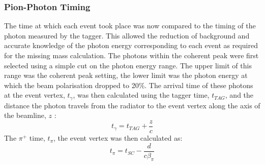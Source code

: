 \subsubsection{Pion-Photon Timing}
The time at which each event took place was now compared to the timing of the photon measured by the tagger. This allowed the reduction of background and accurate knowledge of the photon energy corresponding to each event as required for the missing mass calculation. The photons within the coherent peak were first selected using a simple cut on the photon energy range. The upper limit of this range was the coherent peak setting, the lower limit was the photon energy at which the beam polarisation dropped to 20\%. The arrival time of these photons at the event vertex, $ t_\gamma$, was then calculated using the tagger time, $t_{TAG}$, and the distance the photon travels from the radiator to the event vertex along the axis of the beamline, $z$ :
$$
t_\gamma = t_{TAG} + \frac{z}{c}
$$
The $\pi^+$ time, $t_\pi$, the event vertex was then calculated as:
$$
t_\pi = t_{SC} - \frac{d}{c \beta_\pi}
$$
